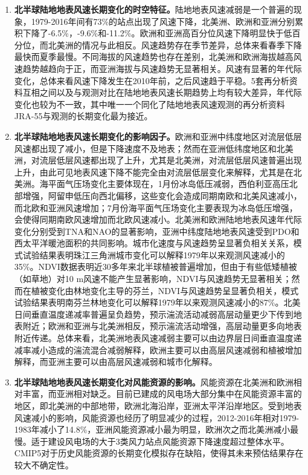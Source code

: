 \begin{enumerate}

\item \textbf{北半球陆地地表风速长期变化的时空特征。}陆地地表风速减弱是一个普遍的现象，1979-2016年间有73\%的站点出现了风速下降，北美洲、欧洲和亚洲分别累积下降了-6.5\%，-9.6\%和-11.2\%。欧洲和亚洲高百分位风速下降明显快于低百分位，而北美洲的情况与此相反。风速趋势存在季节差异，总体来看春季下降最快而夏季最慢。不同海拔的风速趋势也存在差别，北美洲和欧洲海拔越高风速趋势越趋向于正，而亚洲海拔与风速趋势无显著相关。风速有显著的年代际变化，总体来看风速下降发生在2010年前，之后风速趋于平稳。5套再分析资料互相之间以及与观测对比在陆地地表风速长期趋势上均有较大差异，年代际变化也较为不一致，其中唯一一个同化了陆地地表风速观测的再分析资料JRA-55与观测的长期变化最为接近。

\item \textbf{北半球陆地地表风速长期变化的影响因子。}欧洲和亚洲中纬度地区对流层低层风速都出现了减小，但是下降速度不及地表；然而在亚洲低纬度地区和北美洲，对流层低层风速都出现了上升，尤其是北美洲，对流层低层风速普遍出现上升，由此可见地表风速下降不能完全由对流层低层变化来解释，尤其是在北美洲。海平面气压场变化主要体现在，1月份冰岛低压减弱，西伯利亚高压北部增强，阿留申低压向西北偏移，这些变化会造成同期南欧和北美风速减小，而北欧和亚洲风速增加；7月份海平面气压场变化主要表现为冰岛低压增强，会使得同期南欧风速增加而北欧风速减小。北美洲和欧洲陆地地表风速年代际变化分别受到TNA和NAO的显著影响，亚洲中纬度陆地地表风速受到PDO和西太平洋暖池面积的共同影响。城市化速度与风速趋势呈显著负相关关系，模式试验结果表明珠江三角洲城市变化可以解释1979年以来观测风速减小的35\%。NDVI数据表明近30多年来北半球植被普遍增加，但由于有些低矮植被（如草地）对10 m风速不能产生显著影响，NDVI与风速趋势无显著相关；然而在植被变化由林地变化主导的芬兰，NDVI与风速趋势呈显著负相关，模式试验结果表明南芬兰林地变化可以解释1979年以来观测风速减小的87\%。北美日间垂直温度递减率普遍呈负趋势，预示湍流活动减弱高层动量更少下传到地表附近；欧洲和亚洲与北美洲相反，预示湍流活动增强，高层动量更多向地表附近传递。总体来看，北美洲地表风速减弱主要可以由边界层日间垂直温度递减率减小造成的湍流混合减弱解释，欧洲主要可以由高层风速减弱和植被增加解释，而亚洲主要可以由高层风速减弱和城市化解释。

\item \textbf{北半球陆地地表风速长期变化对风能资源的影响。}风能资源在北美洲和欧洲相对丰富，而亚洲相对缺乏。目前已建成的风电场大部分集中在风能资源丰富的地区，即北美洲的中部地带，欧洲北海沿岸，亚洲太平洋沿岸地区。受到地表风速减小的影响，风能资源也经历了明显减少的过程，2012-2016年相对1979-1983年减小了14.8\%，亚洲风能资源减小最为明显，欧洲次之而北美洲减小最慢。适于建设风电场的大于3类风力站点风能资源下降速度超过整体水平。CMIP5对于历史风能资源的长期变化模拟存在缺陷，使得其未来预估结果存在较大不确定性。

\end{enumerate}

